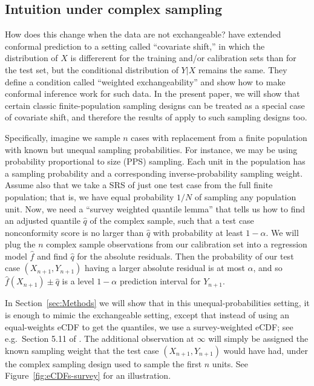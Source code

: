 \documentclass[10.5pt, letterpaper]{article}
\numberwithin{table}{section}
\numberwithin{figure}{section}
\numberwithin{equation}{section}
\begin{document}
\subsection{Intuition under complex sampling}\label{sec:IntuitionWtd}

How does this change when the data are not exchangeable?
\cite{tibshirani2019conformal} have extended conformal prediction to a setting called ``covariate shift,'' in which the distribution of $X$ is differerent for the training and/or calibration sets than for the test set, but the conditional distribution of $Y|X$ remains the same.
They define a condition called ``weighted exchangeability'' and show how to make conformal inference work for such data. In the present paper, we will show that certain classic finite-population sampling designs can be treated as a special case of covariate shift, and therefore the results of \cite{tibshirani2019conformal} apply to such sampling designs too.

Specifically, imagine we sample $n$ cases with replacement from a finite population with known but unequal sampling probabilities. For instance, we may be using probability proportional to size (PPS) sampling. Each unit in the population has a sampling probability and a corresponding inverse-probability sampling weight. Assume also that we take a SRS of just one test case from the full finite population; that is, we have equal probability $1/N$ of sampling any population unit. Now, we need a ``survey weighted quantile lemma'' that tells us how to find an adjusted quantile $\hat q$ of the complex sample, such that a test case nonconformity score is no larger than $\hat q$ with probability at least $1-\alpha$. We will plug the $n$ complex sample observations from our calibration set into a regression model $\hat f$ and find $\hat q$ for the absolute residuals. Then the probability of our test case $(X_{n+1},Y_{n+1})$ having a larger absolute residual is at most $\alpha$, and so $\hat f(X_{n+1}) \pm \hat q$ is a level $1-\alpha$ prediction interval for $Y_{n+1}$.

In Section~\ref{sec:Methods} we will show that in this unequal-probabilities setting, it is enough to mimic the exchangeable setting, except that instead of using an equal-weights eCDF to get the quantiles, we use a survey-weighted eCDF; see e.g.\ Section 5.11 of \cite{sarndal1992model}. The additional observation at $\infty$ will simply be assigned the known sampling weight that the test case $(X_{n+1},Y_{n+1})$ would have had, under the complex sampling design used to sample the first $n$ units.
See Figure~\ref{fig:eCDFs-survey} for an illustration.
\end{document}
